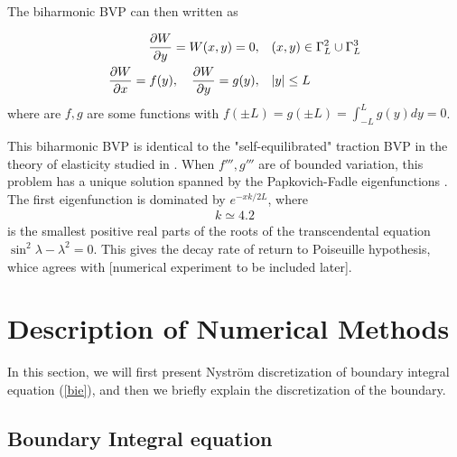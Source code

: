 \documentclass[10pt,twocolumn]{article}
\begin{document}
The biharmonic BVP can then written as 

\begin{align}
  \pdv{W}{y}(x,y) = W(x,y) = 0, \quad &(x,y) \in \Gamma_L^2 \cup \Gamma_L^3 \\
  \pdv{W}{x}(0,y) = f(y),\quad \pdv{W}{y}(0,y) = g(y), \quad &|y| \le L
\end{align}
where are $f,g$ are some functions with $f(\pm L) = g(\pm L) = \int_{-L}^L g(y)dy = 0$. 


This biharmonic BVP is identical to the "self-equilibrated" traction BVP in the theory of elasticity studied in
\cite{gregoryTractionBoundaryValue1980,horganDECAYESTIMATESBIHARMONIC1989,coRecentDevelopmentsConcerning1983}. 
When $f''',g'''$ are of bounded variation, 
this problem has a unique solution spanned by the Papkovich-Fadle eigenfunctions \cite{gregoryTractionBoundaryValue1980}.
The first eigenfunction is dominated by $e^{-xk/2L}$, where 
\begin{align*}
  k \simeq 4.2 
\end{align*}
is the smallest positive real parts of the roots 
of the transcendental equation $\sin^2\lambda - \lambda^2=0$. 
This gives the decay rate of return to Poiseuille hypothesis, whice agrees with [numerical experiment to be included later]. 


\section{Description of Numerical Methods\label{sec:numericalmethod}}
In this section, we will first present Nystr\"om discretization of boundary integral equation (\ref{bie}), and then we briefly explain the discretization of the boundary. 

\subsection{Boundary Integral equation}
\end{document}
